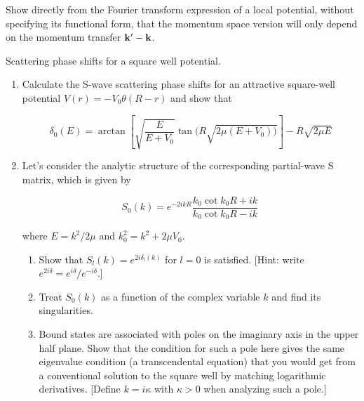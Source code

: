 \documentclass[12pt]{article}
\newcommand{\I}{\item}
\newcommand{\be}{\begin{enumerate}}
\newcommand{\ee}{\end{enumerate}}
\newcommand{\beq}[0]{\begin{small}\[}
\newcommand{\eeq}[0]{\]\end{small}}
\newcommand{\kvec}{{\bf k}}
\begin{document}
  \I Show directly from the Fourier transform expression of a local potential, without
  specifying its functional form, that the momentum space version will only depend on the
 momentum transfer $\kvec'-\kvec$.

  
  \I Scattering phase shifts for a square well
  potential.
   \be
    \I Calculate the S-wave scattering phase shifts for an attractive
    square-well potential $V(r) = -V_0 \theta(R-r)$ and show that
     \beq
       \delta_0(E) = \arctan\left[
         \sqrt{\frac{E}{E+V_0}}\tan\bigl(R\sqrt{2\mu(E+V_0)\bigr)}
         \right] - R\sqrt{2\mu E}
     \eeq

    \I Let's consider the analytic structure of the corresponding partial-wave S matrix,
    which is given by
    \beq
      S_0(k) = e^{-2 i k R} \frac{k_0 \cot k_0 R + ik}{k_0 \cot k_0 R - ik} \,
    \eeq 
    where $E = k^2/2\mu$ and $k_0^2 = k^2 + 2\mu V_0$.
    \be
     \I Show that $S_l(k) = e^{2i\delta_l(k)}$ for $l=0$ is satisfied. 
     [Hint: write $e^{2i\delta} = e^{i\delta}/e^{-i\delta}$.]
     \I Treat $S_0(k)$ as a function of the complex variable $k$ and find its
     singularities.  
     \I
     Bound states are associated with poles on the imaginary axis
     in the upper half plane.  Show that the condition for such a pole here gives
     the same eigenvalue condition (a transcendental equation) that you would get
     from a conventional solution to the square well by matching logarithmic derivatives. 
     [Define $k= i\kappa$ with $\kappa>0$ when analyzing such a pole.]
    \ee
   \ee  
\end{document}
